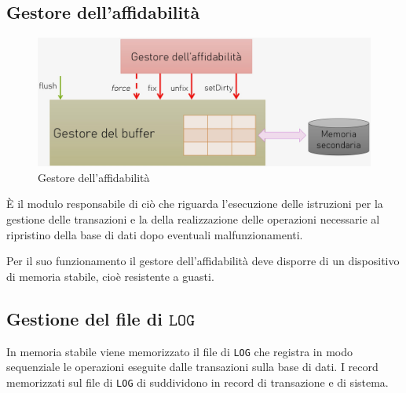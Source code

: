 \documentclass[oneside,a4paper,11pt]{book}
\theoremstyle{italicstyle}
\theoremstyle{normStyle}
\begin{document}
\subsection{Gestore dell'affidabilità}
\begin{figure}[H]
    \centering
    \includegraphics[width=15cm]{img/affidabilita.jpeg}
    \caption{Gestore dell'affidabilità}
    \label{fig:affidabilita}
\end{figure}
È il modulo responsabile di ciò che riguarda l'esecuzione delle istruzioni 
per la gestione delle transazioni e la della realizzazione delle operazioni 
necessarie al ripristino della base di dati dopo eventuali malfunzionamenti.

Per il suo funzionamento il gestore dell'affidabilità deve disporre di un 
dispositivo di memoria stabile, cioè resistente a guasti.
\subsection{Gestione del file di $\texttt{LOG}$}
In memoria stabile viene memorizzato il file di \verb|LOG| che registra in 
modo sequenziale le operazioni eseguite dalle transazioni sulla base 
di dati.
I record memorizzati sul file di \verb|LOG| di suddividono in record di 
transazione e di sistema.
\end{document}
